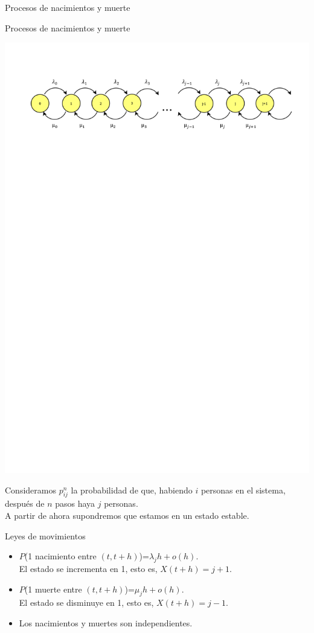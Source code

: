 \begin{frame}
	\centering \LARGE \color{naranjaUCA} Procesos de nacimientos y muerte
\end{frame}

\begin{frame}{Procesos de nacimientos y muerte}
	\begin{center}
		\includegraphics[trim = 10mm 220mm 10mm 25mm, clip,width=0.9\linewidth]{diagramatasa}
	\end{center}
	\pause
	Consideramos $p_{ij}^n$ la probabilidad de que, habiendo $i$ personas en el sistema, después de $n$ pasos haya $j$ personas. \\
	A partir de ahora supondremos que estamos en un estado estable.

\end{frame}
\begin{frame}{Leyes de movimientos}
	\begin{itemize}
		
		\item $P$(1 nacimiento entre $(t, t+h)$)=$\lambda_j h +o(h)$.\\
		El estado se incrementa en 1, esto es, $X(t+h)=j+1$.

		\item $P$(1 muerte entre $(t, t+h)$)=$\mu_j h +o(h)$.\\
		El estado se disminuye en 1, esto es, $X(t+h)=j-1$.
		
		\item Los nacimientos y muertes son independientes.
		
		
	\end{itemize} 

\end{frame}

